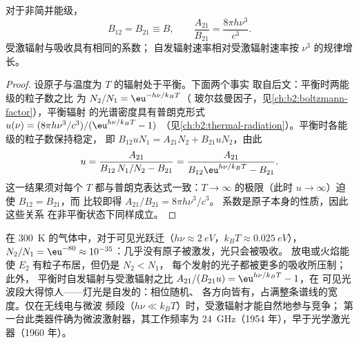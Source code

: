 \begin{proposition}[爱因斯坦关系]\label{prop:b2:laser:einstein}
对于非简并能级，
\[
B_{12} = B_{21} \equiv B, \qquad
\frac{A_{21}}{B_{21}} = \frac{8\pi h\nu^3}{c^3}.
\]
受激辐射与吸收具有相同的系数；
自发辐射速率相对受激辐射速率按 $\nu^3$ 的规律增长。
\end{proposition}

\begin{proof}
设原子与温度为 $T$ 的辐射处于平衡。下面两个事实
取自后文：平衡时两能级的粒子数之比
为 $N_2/N_1 = \eu^{-h\nu/k_BT}$（
玻尔兹曼因子，见\cref{ch:b2:boltzmann-factor}），平衡辐射
的光谱密度具有普朗克形式
$u(\nu) = (8\pi h\nu^3/c^3)/(\eu^{h\nu/k_BT} - 1)$
（见\cref{ch:b2:thermal-radiation}）。平衡时各能级的粒子数保持稳定，
即 $B_{12}uN_1 = A_{21}N_2 + B_{21}uN_2$，由此
\[
u = \frac{A_{21}}{B_{12}\,N_1/N_2 - B_{21}}
  = \frac{A_{21}}{B_{12}\eu^{h\nu/k_BT} - B_{21}}.
\]
这一结果须对每个 $T$ 都与普朗克表达式一致：$T \to \infty$
的极限（此时 $u \to \infty$）迫使 $B_{12} = B_{21}$，而
比较即得 $A_{21}/B_{21} = 8\pi h\nu^3/c^3$。
系数是原子本身的性质，因此这些关系
在非平衡状态下同样成立。
\end{proof}

\begin{remark}[为什么灯不能放大]\label{rem:b2:laser:lamps}
在 \qty{300}{K} 的气体中，对于可见光跃迁（$h\nu \approx
\qty{2}{eV}$，$k_BT \approx \qty{0.025}{eV}$），$N_2/N_1 = \eu^{-80} \approx
10^{-35}$：几乎没有原子被激发，光只会被吸收。
放电或火焰能使 $E_2$ 有粒子布居，但仍是 $N_2 < N_1$，
每个发射的光子都被更多的吸收所压制；此外，
平衡时自发辐射与受激辐射之比
$A_{21}/(B_{21}u) = \eu^{h\nu/k_BT} - 1$，在
可见光波段大得惊人——灯光是自发的：相位随机、
各方向皆有，占满整条谱线的宽度。仅在无线电与微波
频段（$h\nu \ll k_BT$）时，受激辐射才能自然地参与竞争；
第一台此类器件确为微波激射器，其工作频率为
\qty{24}{GHz}（1954 年），早于光学激光器（1960 年）。
\end{remark}

